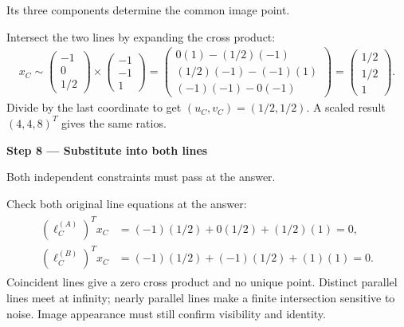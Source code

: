 \documentclass[letterpaper,11pt,english,openany,oneside]{jupyterBook}
\begin{document}
\sphinxAtStartPar
{} Its three components determine the common image point.

\sphinxAtStartPar
Intersect the two lines by expanding the cross product:
{\color{QuizMathBlue} \begin{equation*}
\begin{split}
x_C\sim\begin{pmatrix}-1\\0\\1/2\end{pmatrix}\times\begin{pmatrix}-1\\-1\\1\end{pmatrix}
=\begin{pmatrix}0(1)-(1/2)(-1)\\(1/2)(-1)-(-1)(1)\\(-1)(-1)-0(-1)\end{pmatrix}
=\begin{pmatrix}1/2\\1/2\\1\end{pmatrix}.
\end{split}
\end{equation*}}
\sphinxAtStartPar
Divide by the last coordinate to get {\color{QuizMathBlue} \((u_C,v_C)=(1/2,1/2)\)}. A scaled result {\color{QuizMathBlue} \((4,4,8)^T\)} gives the same ratios.

\par

\par\medskip{}
{\color{QuizStepRed}\bfseries Step 8 — Substitute into both lines}\par\smallskip

\sphinxAtStartPar
{} Both independent constraints must pass at the answer.

\sphinxAtStartPar
Check both original line equations at the answer:
{\color{QuizMathBlue} \begin{equation*}
\begin{split}
\begin{aligned}
(\ell_C^{(A)})^Tx_C&=(-1)(1/2)+0(1/2)+(1/2)(1)=0,\\
(\ell_C^{(B)})^Tx_C&=(-1)(1/2)+(-1)(1/2)+(1)(1)=0.
\end{aligned}
\end{split}
\end{equation*}}
\sphinxAtStartPar
Coincident lines give a zero cross product and no unique point. Distinct parallel lines meet at infinity; nearly parallel lines make a finite intersection sensitive to noise. Image appearance must still confirm visibility and identity.
\end{document}
